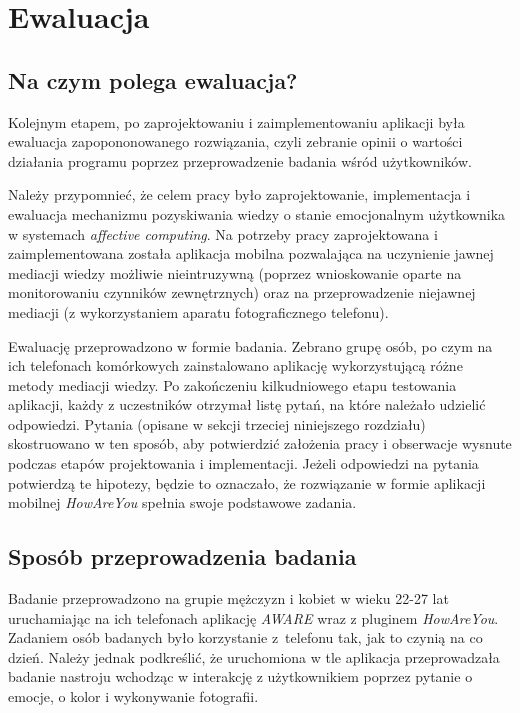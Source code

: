 \chapter{Ewaluacja}
\label{cha:ewaluacja}


\section{Na czym polega ewaluacja?}
\label{sec:naCzymPolegaEwaluacja}

Kolejnym etapem, po zaprojektowaniu i zaimplementowaniu aplikacji była ewaluacja zapopononowanego rozwiązania, czyli zebranie opinii o wartości działania programu poprzez przeprowadzenie badania wśród użytkowników. 

Należy przypomnieć, że celem pracy było zaprojektowanie, implementacja i ewaluacja mechanizmu pozyskiwania wiedzy o  stanie emocjonalnym użytkownika w systemach \textit{affective computing}. Na potrzeby pracy zaprojektowana i zaimplementowana została aplikacja mobilna pozwalająca na uczynienie jawnej mediacji wiedzy możliwie nieintruzywną (poprzez wnioskowanie oparte na monitorowaniu czynników zewnętrznych) oraz na przeprowadzenie niejawnej mediacji (z wykorzystaniem aparatu fotograficznego telefonu). 

Ewaluację przeprowadzono w formie badania. Zebrano grupę osób, po czym na ich telefonach komórkowych zainstalowano aplikację wykorzystującą różne metody mediacji wiedzy. Po zakończeniu kilkudniowego etapu testowania aplikacji, każdy z uczestników otrzymał listę pytań, na które należało udzielić odpowiedzi. Pytania (opisane w sekcji trzeciej niniejszego rozdziału) skostruowano w ten sposób, aby potwierdzić założenia pracy i obserwacje wysnute podczas etapów projektowania i implementacji. Jeżeli odpowiedzi na pytania potwierdzą te hipotezy, będzie to oznaczało, że rozwiązanie w formie aplikacji mobilnej \textit{HowAreYou} spełnia swoje podstawowe zadania.


\section{Sposób przeprowadzenia badania}
\label{sec:sposobPrzeprowadzeniaBadania}

Badanie przeprowadzono na grupie mężczyzn i kobiet w wieku 22-27 lat uruchamiając na ich telefonach aplikację \textit{AWARE} wraz z pluginem \textit{HowAreYou}. Zadaniem osób badanych było korzystanie z~telefonu tak, jak to czynią na co dzień. Należy jednak podkreślić, że uruchomiona w tle aplikacja przeprowadzała badanie nastroju wchodząc w interakcję z użytkownikiem poprzez pytanie o emocje, o kolor i wykonywanie fotografii.

